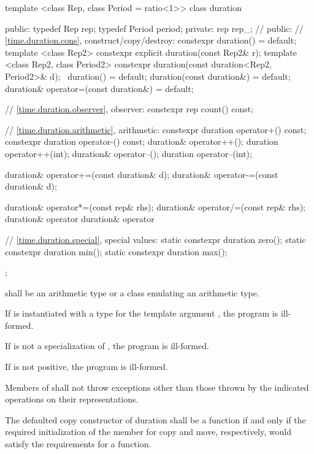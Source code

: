\begin{codeblock}
template <class Rep, class Period = ratio<1>>
class duration {
public:
  typedef Rep    rep;
  typedef Period period;
private:
  rep rep_;  // \expos
public:
  // \ref{time.duration.cons}, construct/copy/destroy:
  constexpr duration() = default;
  template <class Rep2>
      constexpr explicit duration(const Rep2& r);
  template <class Rep2, class Period2>
     constexpr duration(const duration<Rep2, Period2>& d);
  ~duration() = default;
  duration(const duration&) = default;
  duration& operator=(const duration&) = default;

  // \ref{time.duration.observer}, observer:
  constexpr rep count() const;

  // \ref{time.duration.arithmetic}, arithmetic:
  constexpr duration  operator+() const;
  constexpr duration  operator-() const;
  duration& operator++();
  duration  operator++(int);
  duration& operator--();
  duration  operator--(int);

  duration& operator+=(const duration& d);
  duration& operator-=(const duration& d);

  duration& operator*=(const rep& rhs);
  duration& operator/=(const rep& rhs);
  duration& operator%
  duration& operator%

  // \ref{time.duration.special}, special values:
  static constexpr duration zero();
  static constexpr duration min();
  static constexpr duration max();
};
\end{codeblock}

\begin{itemdescr}
\pnum
\requires {} shall be an arithmetic type or a class emulating an arithmetic type.

\pnum
\notes If  is instantiated with a  type for the template
argument , the program is ill-formed.

\pnum
\notes If  is not a specialization of , the program is ill-formed.

\pnum
\notes If  is not positive, the program is ill-formed.

\pnum
\requires Members of  shall not throw exceptions other than
those thrown by the indicated operations on their representations.

\pnum
\remarks The defaulted copy constructor of duration shall be a
 function if and only if the required initialization
of the member  for copy and move, respectively, would
satisfy the requirements for a  function.
\end{itemdescr}


